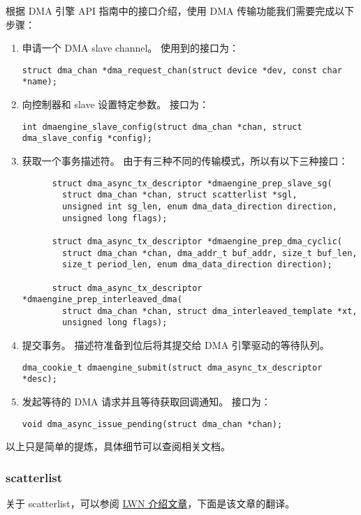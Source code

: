 根据 DMA 引擎 API 指南中的接口介绍，使用 DMA 传输功能我们需要完成以下步骤：

\begin{enumerate}
  \item 申请一个 DMA slave channel。
    使用到的接口为：

    \lstinline!struct dma_chan *dma_request_chan(struct device *dev, const char *name);!

  \item 向控制器和 slave 设置特定参数。
    接口为：

    \lstinline!int dmaengine_slave_config(struct dma_chan *chan, struct dma_slave_config *config);!

  \item 获取一个事务描述符。
    由于有三种不同的传输模式，所以有以下三种接口：
    \begin{lstlisting}
      struct dma_async_tx_descriptor *dmaengine_prep_slave_sg(
        struct dma_chan *chan, struct scatterlist *sgl,
        unsigned int sg_len, enum dma_data_direction direction,
        unsigned long flags);

      struct dma_async_tx_descriptor *dmaengine_prep_dma_cyclic(
        struct dma_chan *chan, dma_addr_t buf_addr, size_t buf_len,
        size_t period_len, enum dma_data_direction direction);

      struct dma_async_tx_descriptor *dmaengine_prep_interleaved_dma(
        struct dma_chan *chan, struct dma_interleaved_template *xt,
        unsigned long flags);
    \end{lstlisting}
  \item 提交事务。
    描述符准备到位后将其提交给 DMA 引擎驱动的等待队列。

    \lstinline!dma_cookie_t dmaengine_submit(struct dma_async_tx_descriptor *desc);!

  \item 发起等待的 DMA 请求并且等待获取回调通知。
    接口为：

    \lstinline!void dma_async_issue_pending(struct dma_chan *chan);!
\end{enumerate}

以上只是简单的提炼，具体细节可以查阅相关文档。

\subsubsection{scatterlist}

关于 scatterlist，可以参阅 \href{https://lwn.net/Articles/234617/}{LWN 介绍文章}，下面是该文章的翻译。

